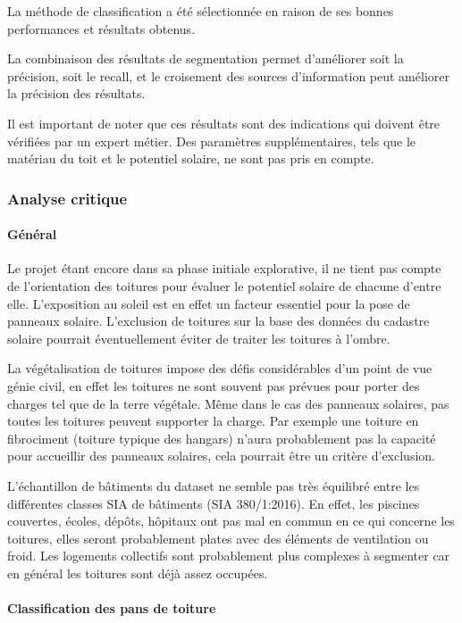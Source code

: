 {{{{La méthode de classification a été sélectionnée en raison de ses bonnes performances et résultats obtenus.

La combinaison des résultats de segmentation permet d'améliorer soit la précision, soit le recall, et le croisement des sources d'information peut améliorer la précision des résultats.

Il est important de noter que ces résultats sont des indications qui doivent être vérifiées par un expert métier. Des paramètres supplémentaires, tels que le matériau du toit et le potentiel solaire, ne sont pas pris en compte.

\subsubsection{Analyse critique}

\paragraph{Général}

Le projet étant encore dans sa phase initiale explorative, il ne tient pas compte de l'orientation des toitures pour évaluer le potentiel solaire de chacune d'entre elle. L'exposition au soleil est en effet un facteur essentiel pour la pose de panneaux solaire. L'exclusion de toitures sur la base des données du cadastre solaire pourrait éventuellement éviter de traiter les toitures à l'ombre.

La végétalisation de toitures impose des défis considérables d'un point de vue génie civil, en effet les toitures ne sont souvent pas prévues pour porter des charges tel que de la terre végétale. Même dans le cas des panneaux solaires, pas toutes les toitures peuvent supporter la charge. Par exemple une toiture en fibrociment (toiture typique des hangars) n'aura probablement pas la capacité pour accueillir des panneaux solaires, cela pourrait être un critère d'exclusion.

L'échantillon de bâtiments du dataset ne semble pas très équilibré entre les différentes classes SIA de bâtiments (SIA 380/1:2016). En effet, les piscines couvertes, écoles, dépôts, hôpitaux ont pas mal en commun en ce qui concerne les toitures, elles seront probablement plates avec des éléments de ventilation ou froid. Les logements collectifs sont probablement plus complexes à segmenter car en général les toitures sont déjà assez occupées.

\paragraph{Classification des pans de toiture}

}}}}
